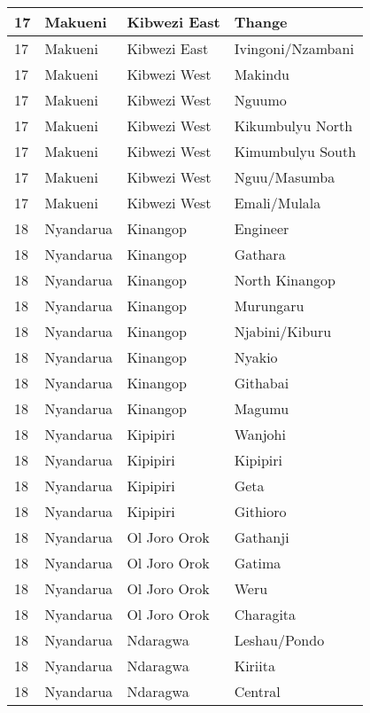 \begin{table}[!ht]
\begin{tabular}{|l|l|l|l|}
        17 & Makueni & Kibwezi East & Thange \\ \hline
        17 & Makueni & Kibwezi East & Ivingoni/Nzambani \\ \hline
        17 & Makueni & Kibwezi West & Makindu \\ \hline
        17 & Makueni & Kibwezi West & Nguumo \\ \hline
        17 & Makueni & Kibwezi West & Kikumbulyu North \\ \hline
        17 & Makueni & Kibwezi West & Kimumbulyu South \\ \hline
        17 & Makueni & Kibwezi West & Nguu/Masumba \\ \hline
        17 & Makueni & Kibwezi West & Emali/Mulala \\ \hline
        18 & Nyandarua & Kinangop & Engineer \\ \hline
        18 & Nyandarua & Kinangop & Gathara \\ \hline
        18 & Nyandarua & Kinangop & North Kinangop \\ \hline
        18 & Nyandarua & Kinangop & Murungaru \\ \hline
        18 & Nyandarua & Kinangop & Njabini/Kiburu \\ \hline
        18 & Nyandarua & Kinangop & Nyakio \\ \hline
        18 & Nyandarua & Kinangop & Githabai \\ \hline
        18 & Nyandarua & Kinangop & Magumu \\ \hline
        18 & Nyandarua & Kipipiri & Wanjohi \\ \hline
        18 & Nyandarua & Kipipiri & Kipipiri \\ \hline
        18 & Nyandarua & Kipipiri & Geta \\ \hline
        18 & Nyandarua & Kipipiri & Githioro \\ \hline
        18 & Nyandarua & Ol Joro Orok & Gathanji \\ \hline
        18 & Nyandarua & Ol Joro Orok & Gatima \\ \hline
        18 & Nyandarua & Ol Joro Orok & Weru \\ \hline
        18 & Nyandarua & Ol Joro Orok & Charagita \\ \hline
        18 & Nyandarua & Ndaragwa & Leshau/Pondo \\ \hline
        18 & Nyandarua & Ndaragwa & Kiriita \\ \hline
        18 & Nyandarua & Ndaragwa & Central \\ \hline

\end{tabular}
\end{table}
